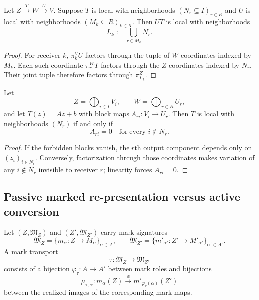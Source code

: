 \begin{theorem}\label{thm:locality-composition-v13}
Let $Z\xrightarrow{T}W\xrightarrow{U}V$. Suppose $T$ is local with neighborhoods $(N_r\subseteq I)_{r\in R}$ and $U$ is local with neighborhoods $(M_k\subseteq R)_{k\in K}$. Then $UT$ is local with neighborhoods
\[
\boxed{L_k:=\bigcup_{r\in M_k}N_r.}
\]
\end{theorem}

\begin{proof}
For receiver $k$, $\pi_k^VU$ factors through the tuple of $W$-coordinates indexed by $M_k$. Each such coordinate $\pi_r^WT$ factors through the $Z$-coordinates indexed by $N_r$. Their joint tuple therefore factors through $\pi_{L_k}^Z$.
\end{proof}

\begin{theorem}\label{thm:affine-locality-v13}
Let
\[
Z=\bigoplus_{i\in I}V_i,
\qquad
W=\bigoplus_{r\in R}U_r,
\]
and let $T(z)=Az+b$ with block maps $A_{ri}:V_i\to U_r$. Then $T$ is local with neighborhoods $(N_r)$ if and only if
\[
\boxed{A_{ri}=0\quad\text{for every }i\notin N_r.}
\]
\end{theorem}

\begin{proof}
If the forbidden blocks vanish, the $r$th output component depends only on $(z_i)_{i\in N_r}$. Conversely, factorization through those coordinates makes variation of any $i\notin N_r$ invisible to receiver $r$; linearity forces $A_{ri}=0$.
\end{proof}

\subsection{Passive marked re-presentation versus active conversion}

\begin{definition}\label{def:mark-transport-v15}
Let $(Z,\mathfrak M_Z)$ and $(Z',\mathfrak M_{Z'})$ carry mark signatures
\[
\mathfrak M_Z=\{m_\alpha:Z\to M_\alpha\}_{\alpha\in A},
\qquad
\mathfrak M_{Z'}=\{m'_{\alpha'}:Z'\to M'_{\alpha'}\}_{\alpha'\in A'}.
\]
A mark transport
\[
\tau:\mathfrak M_Z\to\mathfrak M_{Z'}
\]
consists of a bijection $\varphi_\tau:A\to A'$ between mark roles and bijections
\[
\mu_{\tau,\alpha}:m_\alpha(Z)\xrightarrow{\cong}m'_{\varphi_\tau(\alpha)}(Z')
\]
between the realized images of the corresponding mark maps.
\end{definition}

